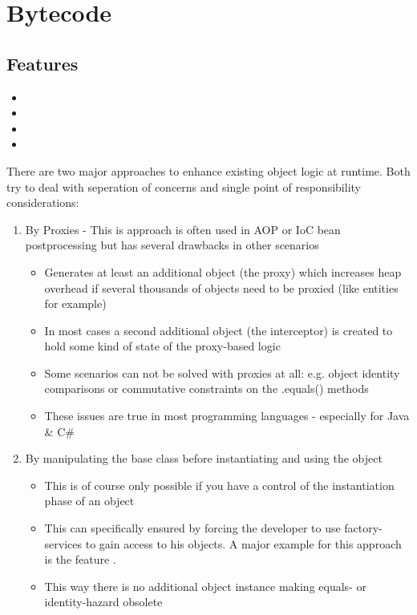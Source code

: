 \section{Bytecode}
\label{module:Bytecode}

\subsection{Features}
\begin{itemize}
	\item {}
	\item {}
	\item {}
	\item {}
\end{itemize}

There are two major approaches to enhance existing object logic at runtime. Both try to deal with seperation of concerns and single point of responsibility considerations:
\begin{enumerate}
	\item By Proxies - This is approach is often used in AOP or IoC bean postprocessing but has several drawbacks in other scenarios
		\begin{itemize}
			\item Generates at least an additional object (the proxy) which increases heap overhead if several thousands of objects need to be proxied (like entities for example)
			\item In most cases a second additional object (the interceptor) is created to hold some kind of state of the proxy-based logic
			\item Some scenarios can not be solved with proxies at all: e.g. object identity comparisons or commutative constraints on the .equals() methods\cite{com14}
			\item These issues are true in most programming languages - especially for Java \& C\#
		\end{itemize}
	\item By manipulating the base class before instantiating and using the object
		\begin{itemize}
			\item This is of course only possible if you have a control of the instantiation phase of an object
			\item This can specifically ensured by forcing the developer to use factory-services to gain access to his objects. A major example for this approach is the feature .
			\item This way there is no additional object instance making equals- or identity-hazard obsolete
		\end{itemize}
\end{enumerate}

